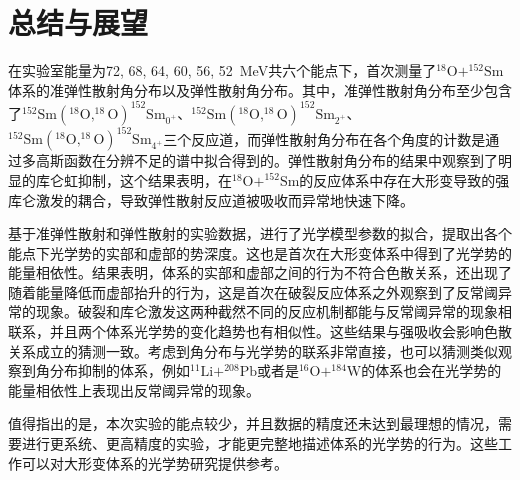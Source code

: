\chapter{总结与展望}

在实验室能量为72, 68, 64, 60, 56, 52~MeV共六个能点下，首次测量了$^{18}\mathrm{O}+^{152}\mathrm{Sm}$体系的准弹性散射角分布以及弹性散射角分布。其中，准弹性散射角分布至少包含了$^{152}\mathrm{Sm}(^{18}\mathrm{O},^{18}\mathrm{O})^{152}\mathrm{Sm}_{0^+}$、$^{152}\mathrm{Sm}(^{18}\mathrm{O},^{18}\mathrm{O})^{152}\mathrm{Sm}_{2^+}$、$^{152}\mathrm{Sm}(^{18}\mathrm{O},^{18}\mathrm{O})^{152}\mathrm{Sm}_{4^+}$三个反应道，而弹性散射角分布在各个角度的计数是通过多高斯函数在分辨不足的谱中拟合得到的。弹性散射角分布的结果中观察到了明显的库仑虹抑制，这个结果表明，在$^{18}\mathrm{O}+^{152}\mathrm{Sm}$的反应体系中存在大形变导致的强库仑激发的耦合，导致弹性散射反应道被吸收而异常地快速下降。

基于准弹性散射和弹性散射的实验数据，进行了光学模型参数的拟合，提取出各个能点下光学势的实部和虚部的势深度。这也是首次在大形变体系中得到了光学势的能量相依性。结果表明，体系的实部和虚部之间的行为不符合色散关系，还出现了随着能量降低而虚部抬升的行为，这是首次在破裂反应体系之外观察到了反常阈异常的现象。破裂和库仑激发这两种截然不同的反应机制都能与反常阈异常的现象相联系，并且两个体系光学势的变化趋势也有相似性。这些结果与强吸收会影响色散关系成立的猜测一致。考虑到角分布与光学势的联系非常直接，也可以猜测类似观察到角分布抑制的体系，例如$^{11}\mathrm{Li}+^{208}\mathrm{Pb}$或者是$^{16}\mathrm{O}+^{184}\mathrm{W}$的体系也会在光学势的能量相依性上表现出反常阈异常的现象。

值得指出的是，本次实验的能点较少，并且数据的精度还未达到最理想的情况，需要进行更系统、更高精度的实验，才能更完整地描述体系的光学势的行为。这些工作可以对大形变体系的光学势研究提供参考。
